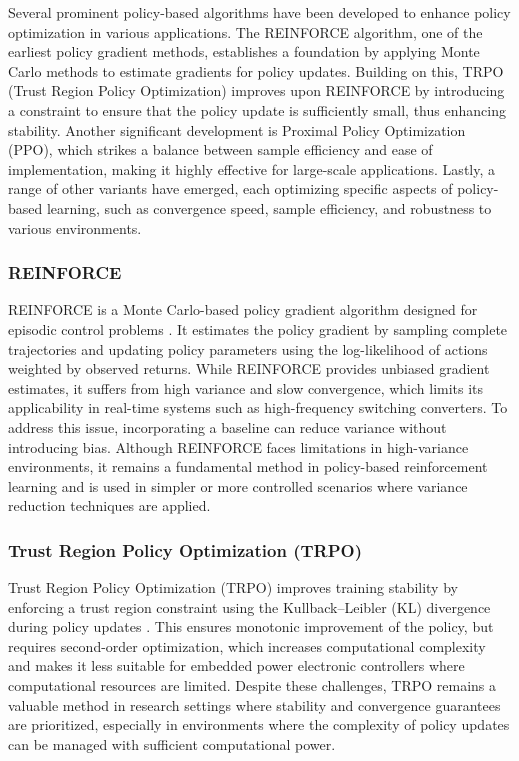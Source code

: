 Several prominent policy-based algorithms have been developed to enhance policy optimization in various applications. The REINFORCE algorithm, one of the earliest policy gradient methods, establishes a foundation by applying Monte Carlo methods to estimate gradients for policy updates. Building on this, TRPO (Trust Region Policy Optimization) improves upon REINFORCE by introducing a constraint to ensure that the policy update is sufficiently small, thus enhancing stability. Another significant development is Proximal Policy Optimization (PPO), which strikes a balance between sample efficiency and ease of implementation, making it highly effective for large-scale applications. Lastly, a range of other variants have emerged, each optimizing specific aspects of policy-based learning, such as convergence speed, sample efficiency, and robustness to various environments.

\subsubsection{REINFORCE}

REINFORCE is a Monte Carlo-based policy gradient algorithm designed for episodic control problems \cite{williams1992simple}. It estimates the policy gradient by sampling complete trajectories and updating policy parameters using the log-likelihood of actions weighted by observed returns. While REINFORCE provides unbiased gradient estimates, it suffers from high variance and slow convergence, which limits its applicability in real-time systems such as high-frequency switching converters. To address this issue, incorporating a baseline can reduce variance without introducing bias. Although REINFORCE faces limitations in high-variance environments, it remains a fundamental method in policy-based reinforcement learning and is used in simpler or more controlled scenarios where variance reduction techniques are applied. 

\subsubsection{Trust Region Policy Optimization (TRPO)}

Trust Region Policy Optimization (TRPO) improves training stability by enforcing a trust region constraint using the Kullback–Leibler (KL) divergence during policy updates \cite{schulman2015trust}. This ensures monotonic improvement of the policy, but requires second-order optimization, which increases computational complexity and makes it less suitable for embedded power electronic controllers where computational resources are limited. Despite these challenges, TRPO remains a valuable method in research settings where stability and convergence guarantees are prioritized, especially in environments where the complexity of policy updates can be managed with sufficient computational power.

